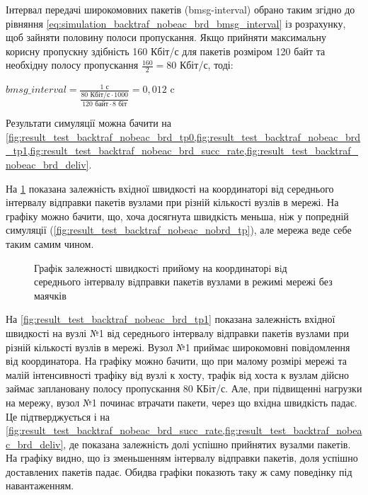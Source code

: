 \documentclass[a4paper,ukrainian,utf8,nocolumnsxix,floatsection,equationsection]{eskdtext}
\newcommand{\longcaption}[1]{\captionsetup{style=figureLongCaption}\caption{#1}}
\begin{document}
Інтервал передачі широкомовних пакетів (bmsg-interval) обрано таким згідно до рівняння \ref{eq:simulation_backtraf_nobeac_brd_bmsg_interval} із розрахунку, щоб зайняти половину полоси пропускання. Якщо прийняти максимальну корисну пропускну здібність 160 Кбіт/с для пакетів розміром 120 байт та необхідну полосу пропускання $\frac{160}{2}=80$ Кбіт/с, тоді:

$	bmsg\_interval = \frac{1 \text{ с}}{\dfrac{80 \text{ Кбіт/с} \cdot 1000}{120 \text{ байт} \cdot 8 \text{ біт}}} = 0,012 \text{ c}$

Результати симуляції можна бачити на \cref{fig:result_test_backtraf_nobeac_brd_tp0,fig:result_test_backtraf_nobeac_brd_tp1,fig:result_test_backtraf_nobeac_brd_succ_rate,fig:result_test_backtraf_nobeac_brd_deliv}.



На \cref{fig:result_test_backtraf_nobeac_brd_tp0} показана залежність вхідної швидкості на координаторі від середнього інтервалу відправки пакетів вузлами при різній кількості вузлів в мережі. На графіку можно бачити, що, хоча досягнута швидкість меньша, ніж у попредній симуляції (\cref{fig:result_test_backtraf_nobeac_nobrd_tp}), але мережа веде себе таким самим чином.
\begin{figure}[htbp]
	\centering
	\longcaption{\label{fig:result_test_backtraf_nobeac_brd_tp0}Графiк залежностi швидкостi прийому на координаторi вiд середнього iнтервалу вiдправки пакетiв вузлами в режимі мережі без маячків}
\end{figure}


На \cref{fig:result_test_backtraf_nobeac_brd_tp1} показана залежність вхідної швидкості на вузлі №1 від середнього інтервалу відправки пакетів вузлами при різній кількості вузлів в мережі. Вузол №1 приймає широкомовні повідомлення від координатора. На графіку можно бачити, що при малому розмірі мережі та малій інтенсивності трафіку від вузлі к хосту, трафік від хоста к вузлам дійсно займає заплановану полосу пропускання 80 КБіт/с. Але, при підвищенні нагрузки на мережу, вузол №1 починає втрачати пакети, через що вхідна швидкість падає. Це підтверджується і на \cref{fig:result_test_backtraf_nobeac_brd_succ_rate,fig:result_test_backtraf_nobeac_brd_deliv}, де показана залежність долі успішно прийнятих вузалми пакетів. На графіку видно, що із зменьшенням інтервалу відправки пакетів, доля успішно доставлених пакетів падає. Обидва графіки показють таку ж саму поведінку під навантаженням. 
\end{document}
